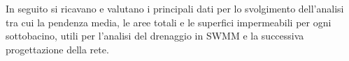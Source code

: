 In seguito si ricavano e valutano i principali dati per lo svolgimento dell'analisi tra cui la pendenza media, le aree totali e le superfici impermeabili per ogni sottobacino, utili per l'analisi del drenaggio in SWMM e la successiva progettazione della rete.

